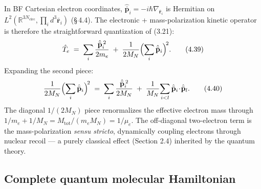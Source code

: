 In BF Cartesian electron coordinates, $\hat{\bar{\mathbf{p}}}_i = -i\hbar\nabla_{\bar{\mathbf{r}}_i}$ is Hermitian on $L^{2}(\mathbb{R}^{3N_{\mathrm{elec}}},\prod_id^{3}\bar{\mathbf{r}}_i)$ (\S\,4.4). The electronic + mass-polarization kinetic operator is therefore the straightforward quantization of (3.21):
\begin{equation}
\hat T_e \;=\; \sum_i\frac{\hat{\bar{\mathbf{p}}}_i^{\,2}}{2m_e} \;+\; \frac{1}{2M_N}\Bigl(\sum_i\hat{\bar{\mathbf{p}}}_i\Bigr)^{\!2}. \tag{4.39}
\end{equation}
Expanding the second piece:
\begin{equation}
\frac{1}{2M_N}\Bigl(\sum_i\hat{\bar{\mathbf{p}}}_i\Bigr)^{\!2} \;=\; \sum_i\frac{\hat{\bar{\mathbf{p}}}_i^{\,2}}{2M_N} \;+\; \frac{1}{M_N}\!\sum_{i<l}\hat{\bar{\mathbf{p}}}_i\!\cdot\!\hat{\bar{\mathbf{p}}}_l. \tag{4.40}
\end{equation}
The diagonal $1/(2M_N)$ piece renormalizes the effective electron mass through $1/m_e + 1/M_N = M_{\mathrm{tot}}/(m_e M_N) = 1/\mu_e$. The off-diagonal two-electron term is the mass-polarization \emph{sensu stricto}, dynamically coupling electrons through nuclear recoil --- a purely classical effect (Section 2.4) inherited by the quantum theory.

\subsection{Complete quantum molecular Hamiltonian}

